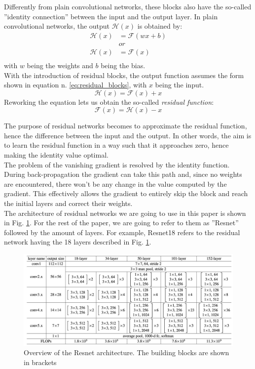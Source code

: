 Differently from plain convolutional networks, these blocks also have the so-called ''identity connection'' between the input and the output layer. 
In plain convolutional networks, the output $\mathcal{H}(x)$ is obtained by:
\begin{align*}
\mathcal{H}(x) &= \mathcal{F}(wx + b)\\
               &or\\
\mathcal{H}(x) &= \mathcal{F}(x)\\   
\end{align*}
with $w$ being the weights and $b$ being the bias.\\
With the introduction of residual blocks, the output function assumes the form shown in equation n. \ref{eq:residual_blocks}, with $x$ being the input.
\begin{equation}
\mathcal{H}(x) = \mathcal{F}(x) + x
\label{eq:residual_blocks}   
\end{equation}
Reworking the equation lets us obtain the so-called \textit{residual function}: 
\begin{equation}
\mathcal{F}(x) = \mathcal{H}(x) - x
\label{eq:residual_function}   
\end{equation}

The purpose of residual networks becomes to approximate the residual function, hence the difference between the input and the output. In other words, the aim is to learn the residual function in a way such that it approaches zero, hence making the identity value optimal. \\
The problem of the vanishing gradient is resolved by the identity function. During back-propagation the gradient can take this path and, since no weights are encountered, there won't be any change in the value computed by the gradient. This effectively allows the gradient to entirely skip the block and reach the initial layers and correct their weights. \\
The architecture of residual networks we are going to use in this paper is shown in Fig. \ref{fig:resnet_arch}. For the rest of the paper, we are going to refer to them as ''Resnet'' followed by the amount of layers. For example, Resnet18 refers to the residual network having the 18 layers described in Fig.  \ref{fig:resnet_arch}. 
\begin{figure}[t]
    \centering
    \includegraphics[scale = 0.5]{img/resnet_arch.png}
    \caption[Overview of the Resnet architecture]{Overview of the Resnet architecture. The building blocks are shown in brackets \cite{DBLP:journals/corr/HeZRS15}}
    \label{fig:resnet_arch}
\end{figure}


